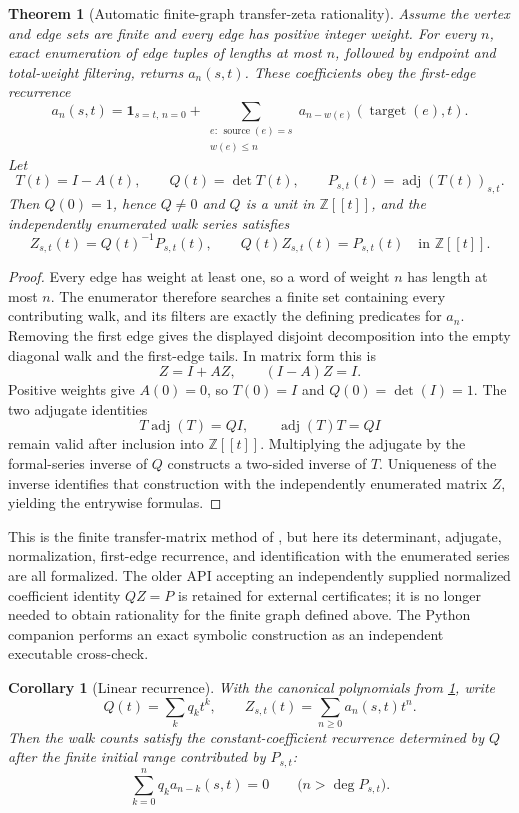 \documentclass[11pt,a4paper]{article}
\newtheorem{theorem}{Theorem}[section]
\newtheorem{corollary}[corollary]{Corollary}
\theoremstyle{definition}
\theoremstyle{remark}
\providecommand{\Z}{\mathbb Z}
\theoremstyle{definition}\newtheorem{construction}[theorem]{Construction}\newtheorem{certificate}[theorem]{Numerical Certificate}
\theoremstyle{remark}\newtheorem{boundary}[theorem]{Boundary}
\begin{document}
\begin{theorem}[Automatic finite-graph transfer-zeta rationality]\label{thm:transfer-zeta}
Assume the vertex and edge sets are finite and every edge has positive integer
weight. For every $n$, exact enumeration of edge tuples of lengths at most
$n$, followed by endpoint and total-weight filtering, returns $a_n(s,t)$.
These coefficients obey the first-edge recurrence
\[
a_n(s,t)
=
\mathbf 1_{s=t,\,n=0}
+\sum_{\substack{e:\,\operatorname{source}(e)=s\\w(e)\le n}}
a_{n-w(e)}(\operatorname{target}(e),t).
\]
Let
\[
T(t)=I-A(t),\qquad
Q(t)=\det T(t),\qquad
P_{s,t}(t)=\operatorname{adj}(T(t))_{s,t}.
\]
Then $Q(0)=1$, hence $Q\ne0$ and $Q$ is a unit in $\Z[[t]]$, and the
independently enumerated walk series satisfies
\[
\boxed{
Z_{s,t}(t)=Q(t)^{-1}P_{s,t}(t),
\qquad
Q(t)Z_{s,t}(t)=P_{s,t}(t)
}
\quad\text{in }\Z[[t]].
\]
\end{theorem}

\begin{proof}
Every edge has weight at least one, so a word of weight $n$ has length at
most $n$. The enumerator therefore searches a finite set containing every
contributing walk, and its filters are exactly the defining predicates for
$a_n$. Removing the first edge gives the displayed disjoint decomposition
into the empty diagonal walk and the first-edge tails. In matrix form this is
\[
Z=I+AZ,
\qquad (I-A)Z=I.
\]
Positive weights give $A(0)=0$, so $T(0)=I$ and
$Q(0)=\det(I)=1$. The two adjugate identities
\[
T\operatorname{adj}(T)=Q I,
\qquad
\operatorname{adj}(T)T=Q I
\]
remain valid after inclusion into $\Z[[t]]$. Multiplying the adjugate by the
formal-series inverse of $Q$ constructs a two-sided inverse of $T$.
Uniqueness of the inverse identifies that construction with the independently
enumerated matrix $Z$, yielding the entrywise formulas.
\end{proof}

This is the finite transfer-matrix method of \cite{Stanley2012}, but here its
determinant, adjugate, normalization, first-edge recurrence, and identification
with the enumerated series are all formalized. The older API accepting an
independently supplied normalized coefficient identity $QZ=P$ is retained for
external certificates; it is no longer needed to obtain rationality for the
finite graph defined above. The Python companion performs an exact symbolic
construction as an independent executable cross-check.

\begin{corollary}[Linear recurrence]\label{cor:zeta-recurrence}
With the canonical polynomials from \cref{thm:transfer-zeta}, write
\[
Q(t)=\sum_kq_kt^k,
\qquad
Z_{s,t}(t)=\sum_{n\ge0}a_n(s,t)t^n.
\]
Then the walk counts satisfy the constant-coefficient recurrence determined by
$Q$ after the finite initial range contributed by $P_{s,t}$:
\[
\boxed{
\sum_{k=0}^{n}q_k a_{n-k}(s,t)=0
\qquad\bigl(n>\deg P_{s,t}\bigr).
}
\]
\end{corollary}
\end{document}
